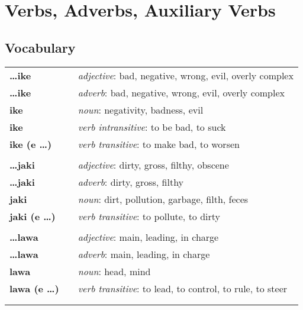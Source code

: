\section{Verbs, Adverbs, Auxiliary Verbs}
%
\subsection*{Vocabulary}
\begin{supertabular}{p{2,5cm}|ll}
%
\textbf{\dots ike} && \textit{adjective}: bad, negative, wrong, evil, overly complex \\ %
\textbf{\dots ike} && \textit{adverb}: bad, negative, wrong, evil, overly complex \\ %
\textbf{ike} && \textit{noun}: negativity, badness, evil \\ %
\textbf{ike} && \textit{verb intransitive}: to be bad, to suck \\ %
\textbf{ike (e \dots)} && \textit{verb transitive}: to make bad, to worsen \\ %
 && \\ %
%
\textbf{\dots jaki} && \textit{adjective}: dirty, gross, filthy, obscene \\ %
\textbf{\dots jaki} && \textit{adverb}: dirty, gross, filthy \\ %
\textbf{jaki} && \textit{noun}: dirt, pollution, garbage, filth, feces \\ %
\textbf{jaki (e \dots)} && \textit{verb transitive}: to pollute, to dirty \\ %
 && \\ %
%
\textbf{\dots lawa} && \textit{adjective}: main, leading, in charge \\ %
\textbf{\dots lawa} && \textit{adverb}: main, leading, in charge \\ %
\textbf{lawa} && \textit{noun}: head, mind \\ %
\textbf{lawa (e \dots)} && \textit{verb transitive}: to lead, to control, to rule, to steer \\ %
 && \\ %
%

\end{supertabular}
